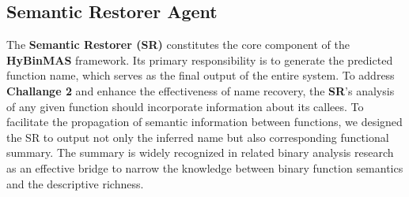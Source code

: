 \documentclass[acmsmall,screen,review,anonymous]{acmart} %
\begin{document}



\subsection{Semantic Restorer Agent}
\label{sec:sr_design}

The \textbf{Semantic Restorer (SR)} constitutes the core component of the \textbf{HyBinMAS} framework. Its primary responsibility is to generate the predicted function name, which serves as the final output of the entire system. To address \textbf{Challange 2} and enhance the effectiveness of name recovery, the \textbf{SR}'s analysis of any given function should incorporate information about its callees. To facilitate the propagation of semantic information between functions, we designed the SR to output not only the inferred name but also corresponding functional summary. The summary is widely recognized in related binary analysis research\cite{SymGen, FoC} as an effective bridge to narrow the knowledge between binary function semantics and the descriptive richness.
\end{document}
